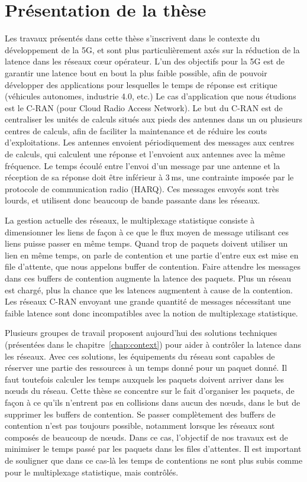 
\chapter*{Présentation de la thèse}
\label{chap:introfr}
\minitoc

Les travaux présentés dans cette thèse s'inscrivent dans le contexte du développement de la 5G, et sont plus particulièrement axés sur la réduction de la latence dans les réseaux cœur opérateur.
L'un des objectifs pour la 5G est de garantir une latence bout en bout la plus faible possible, afin de pouvoir développer des applications pour lesquelles le temps de réponse est critique (véhicules autonomes, industrie 4.0, etc.)
Le cas d'application que nous étudions est le C-RAN (pour Cloud Radio Access Network). Le but du C-RAN est de centraliser les unités de calculs situés aux pieds des antennes dans un ou plusieurs centres de calculs, afin de faciliter la maintenance et de réduire les couts d'exploitations. Les antennes envoient périodiquement des messages aux centres de calculs, qui calculent une réponse et l'envoient aux antennes avec la même fréquence. Le temps écoulé entre l'envoi d'un message par une antenne et la réception de sa réponse doit être inférieur à 3 ms, une contrainte imposée par le protocole de communication radio (HARQ). Ces messages envoyés sont très lourds, et utilisent donc beaucoup de bande passante dans les réseaux.

La gestion actuelle des réseaux, le multiplexage statistique consiste à dimensionner les liens de façon à ce que le flux moyen de message utilisant ces liens puisse passer en même temps. Quand trop de paquets doivent utiliser un lien en même temps, on parle de contention et une partie d'entre eux est mise en file d'attente, que nous appelons buffer de contention. Faire attendre les messages dans ces buffers de contention augmente la latence des paquets. Plus un réseau est chargé, plus la chance que les latences augmentent à cause de la contention. Les réseaux C-RAN envoyant une grande quantité de messages nécessitant une faible latence sont donc incompatibles avec la notion de multiplexage statistique.

Plusieurs groupes de travail proposent aujourd'hui des solutions techniques (présentées dans le chapitre~\ref{chap:context}) pour aider à contrôler la latence dans les réseaux. Avec ces solutions, les équipements du réseau sont capables de réserver une partie des ressources à un temps donné pour un paquet donné. Il faut toutefois calculer les temps auxquels les paquets doivent arriver dans les nœuds du réseau. Cette thèse se concentre sur le fait d'organiser les paquets, de façon à ce qu'ils n'entrent pas en collisions dans aucun des nœuds, dans le but de supprimer les buffers de contention. Se passer complètement des buffers de contention n'est pas toujours possible, notamment lorsque les réseaux sont composés de beaucoup de nœuds. Dans ce cas, l'objectif de nos travaux est de minimiser le temps passé par les paquets dans les files d'attentes. Il est important de souligner que dans ce cas-là les temps de contentions ne sont plus subis comme pour le multiplexage statistique, mais contrôlés.

